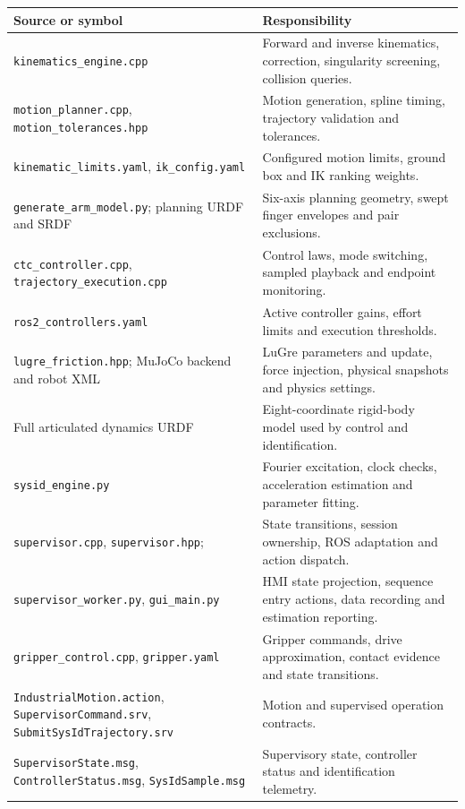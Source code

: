 \documentclass[11pt,a4paper]{report}
\newcommand{\id}[1]{\texttt{\small\detokenize{#1}}}
\newcommand{\file}[1]{\nolinkurl{#1}}
\begin{document}
\begin{longtable}{L{.43\linewidth}L{.50\linewidth}}
\toprule Source or symbol & Responsibility \\\midrule\endhead
\file{kinematics_engine.cpp} & Forward and inverse kinematics, correction, singularity screening, collision queries. \\
\file{motion_planner.cpp}, \file{motion_tolerances.hpp} & Motion generation, spline timing, trajectory validation and tolerances. \\
\file{kinematic_limits.yaml}, \file{ik_config.yaml} & Configured motion limits, ground box and IK ranking weights. \\
\file{generate_arm_model.py}; planning URDF and SRDF & Six-axis planning geometry, swept finger envelopes and pair exclusions. \\
\file{ctc_controller.cpp}, \file{trajectory_execution.cpp} & Control laws, mode switching, sampled playback and endpoint monitoring. \\
\file{ros2_controllers.yaml} & Active controller gains, effort limits and execution thresholds. \\
\file{lugre_friction.hpp}; MuJoCo backend and robot XML & LuGre parameters and update, force injection, physical snapshots and physics settings. \\
Full articulated dynamics URDF & Eight-coordinate rigid-body model used by control and identification. \\
\file{sysid_engine.py} & Fourier excitation, clock checks, acceleration estimation and parameter fitting. \\
\file{supervisor.cpp}, \file{supervisor.hpp}; \id{IndustrialPlannerNode} & State transitions, session ownership, ROS adaptation and action dispatch. \\
\file{supervisor_worker.py}, \file{gui_main.py} & HMI state projection, sequence entry actions, data recording and estimation reporting. \\
\file{gripper_control.cpp}, \file{gripper.yaml} & Gripper commands, drive approximation, contact evidence and state transitions. \\
\file{IndustrialMotion.action}, \file{SupervisorCommand.srv}, \file{SubmitSysIdTrajectory.srv} & Motion and supervised operation contracts. \\
\file{SupervisorState.msg}, \file{ControllerStatus.msg}, \file{SysIdSample.msg} & Supervisory state, controller status and identification telemetry. \\
\bottomrule
\end{longtable}
\end{document}
